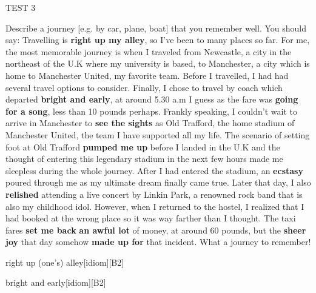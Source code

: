 \begin{glossarymc}[Cambridge 9]
\begin{test}{TEST 3}
\begin{qa}{Describe a journey [e.g. by car, plane, boat] that you remember well. You should say:}
    Travelling is \textbf{right up my alley}, so I've been to many places so far. For me, the most memorable journey is when I traveled from Newcastle, a city in the northeast of the U.K where my university is based, to Manchester, a city which is home to Manchester United, my favorite team. Before I travelled, I had had several travel options to consider. Finally, I chose to travel by coach which departed \textbf{bright and early}, at around 5.30 a.m I guess as the fare was \textbf{going for a song}, less than 10 pounds perhaps. Frankly speaking, I couldn't wait to arrive in Manchester to \textbf{see the sights} as Old Trafford, the home stadium of Manchester United, the team I have supported all my life. The scenario of setting foot at Old Trafford \textbf{pumped me up} before I landed in the U.K and the thought of entering this legendary stadium in the next few hours made me sleepless during the whole journey. After I had entered the stadium, an \textbf{ecstasy} poured through me as my ultimate dream finally came true. Later that day, I also \textbf{relished} attending a live concert by Linkin Park, a renowned rock band that is also my childhood idol. However, when I returned to the hostel, I realized that I had booked at the wrong place so it was way farther than I thought. The taxi fares \textbf{set me back} \textbf{an awful lot} of money, at around 60 pounds, but the \textbf{sheer joy} that day somehow \textbf{made up for} that incident. What a journey to remember!
    \end{qa}

        \begin{VocabExplain}[Part 2]
            \begin{ExplainCard}{right up (one's) alley}[idiom][B2]
            \end{ExplainCard}

            \begin{ExplainCard}{bright and early}[idiom][B2]
            \end{ExplainCard}


\end{VocabExplain}
\end{test}
\end{glossarymc}
